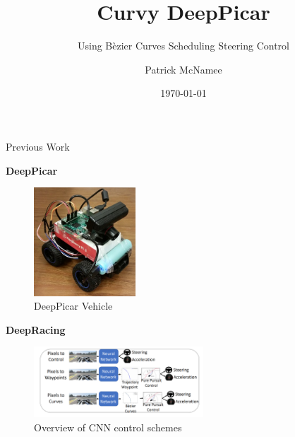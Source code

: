 \documentclass[aspectratio=169,xcolor=dvipsnames]{beamer}
\title[EECS 753 Project]{Curvy DeepPicar}
\subtitle{Using B\`ezier Curves Scheduling Steering Control}
\author[McNamee] {Patrick McNamee}
\institute[KU] %
{
    Department of Computer Science and Electrical Engineering \\
    University of Kansas
    \vskip 3pt
}
\date{\today} %
\begin{document}
\begin{frame}
    \titlepage
\end{frame}

\begin{frame}{Previous Work}
    \begin{multicols}{2}
    {\hfill \Large\bfseries DeepPicar \hfill}
    \begin{figure}[hbt!]
        \centering
        \includegraphics[width=1.5in]{../figures/presentation/DeepPicar.jpg}
        \caption{DeepPicar Vehicle \cite{bechtel2018picar}}
        \label{fig:deeppicar-vehicle}
    \end{figure}
    
    
    \columnbreak
    
    {\hfill \Large\bfseries DeepRacing \hfill}
    \begin{figure}[hbt!]
        \centering
        \includegraphics[width=2.5in]{../figures/presentation/deepracing-controls.PNG}
        \caption{Overview of CNN control schemes \cite{deepracing}}
        \label{fig:dr-controls}
    \end{figure}
    \end{multicols}
\end{frame}
\end{document}
